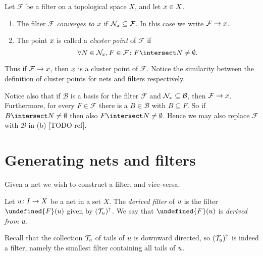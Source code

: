 \documentclass[article, a4paper, 11pt, oneside]{memoir}
\let\mathfrak\undefined
\numberwithin{equation}{chapter}
\newcommand{\calB}{\mathcal{B}}
\newcommand{\calF}{\mathcal{F}}
\theoremstyle{nonumberplain}
\begin{document}
\begin{definition}
    Let $\calF$ be a filter on a topological space $X$, and let $x \in X$.
    \begin{enumerate}
        \item The filter $\calF$ \emph{converges to $x$} if $\nhoods{\mylimit} \subseteq \calF$. In this case we write $\calF \to \mylimit$.
        
        \item The point $x$ is called a \emph{cluster point} of $\calF$ if
        \begin{equation*}
            \forall N \in \nhoods{\mylimit}, F \in \calF \colon F \intersect N \neq \emptyset.
        \end{equation*}
    \end{enumerate}
\end{definition}
%
Thus if $\calF \to \mylimit$, then $x$ is a cluster point of $\calF$. Notice the similarity between the definition of cluster points for nets and filters respectively.

\begin{remark}
    \label{rem:filter-cluster-points}
    Notice also that if $\calB$ is a basis for the filter $\calF$ and $\nhoods{\mylimit} \subseteq \calB$, then $\calF \to \mylimit$. Furthermore, for every $F \in \calF$ there is a $B \in \calB$ with $B \subseteq F$. So if $B \intersect N \neq \emptyset$ then also $F \intersect N \neq \emptyset$. Hence we may also replace $\calF$ with $\calB$ in (b) [TODO ref].
\end{remark}


\section{Generating nets and filters}

Given a net we wish to construct a filter, and vice-versa.

\newcommand{\filter}{\mathfrak{F}}
\newcommand{\net}{\mathfrak{N}}

\begin{definition}
    Let $u \colon I \to X$ be a net in a set $X$. The \emph{derived filter} of $u$ is the filter $\filter(\mynet)$ given by $(\mathcal{T}_{u})^\uparrow$. We say that $\filter(\mynet)$ is \emph{derived from} $u$.
\end{definition}
%
Recall that the collection $\mathcal{T}_{u}$ of tails of $u$ is downward directed, so $(\mathcal{T}_{u})^\uparrow$ is indeed a filter, namely the smallest filter containing all tails of $u$.
\end{document}

